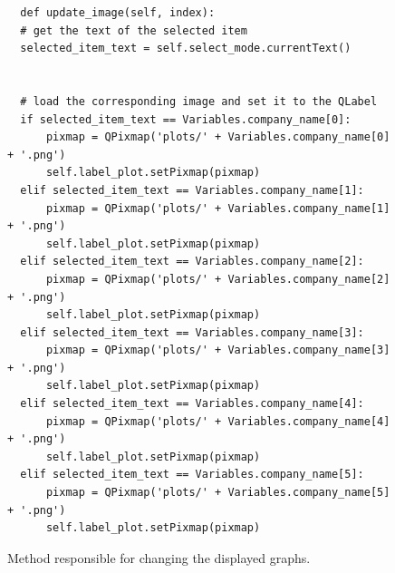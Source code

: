 \begin{figure}
\centering
\begin{lstlisting}
  def update_image(self, index):
  # get the text of the selected item
  selected_item_text = self.select_mode.currentText()


  # load the corresponding image and set it to the QLabel
  if selected_item_text == Variables.company_name[0]:
      pixmap = QPixmap('plots/' + Variables.company_name[0] + '.png')
      self.label_plot.setPixmap(pixmap)
  elif selected_item_text == Variables.company_name[1]:
      pixmap = QPixmap('plots/' + Variables.company_name[1] + '.png')
      self.label_plot.setPixmap(pixmap)
  elif selected_item_text == Variables.company_name[2]:
      pixmap = QPixmap('plots/' + Variables.company_name[2] + '.png')
      self.label_plot.setPixmap(pixmap)
  elif selected_item_text == Variables.company_name[3]:
      pixmap = QPixmap('plots/' + Variables.company_name[3] + '.png')
      self.label_plot.setPixmap(pixmap)
  elif selected_item_text == Variables.company_name[4]:
      pixmap = QPixmap('plots/' + Variables.company_name[4] + '.png')
      self.label_plot.setPixmap(pixmap)
  elif selected_item_text == Variables.company_name[5]:
      pixmap = QPixmap('plots/' + Variables.company_name[5] + '.png')
      self.label_plot.setPixmap(pixmap)
\end{lstlisting}
\caption{Method responsible for changing the displayed graphs.}
\label{fig:pseudocode:listings}
\end{figure}


